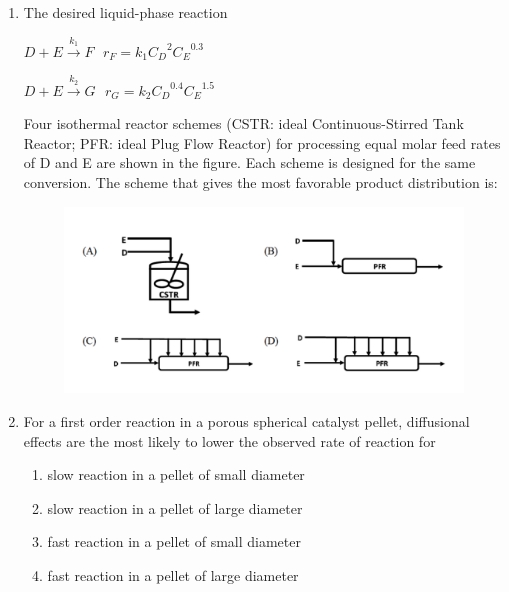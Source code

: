 \documentclass[journal,12pt,onecolumn]{IEEEtran}
\theoremstyle{remark}
\begin{document}
\begin{enumerate}
    \item  The desired liquid-phase reaction

    

     $D + E \overset{k_1}{\to} F \hspace{8pt} r_F = k_1 {C_D}^{2} {C_E}^{0.3}$ 

   
        
            $D + E \overset{k_2}{\to} G \hspace{8pt} r_G = k_2 {C_D}^{0.4} {C_E}^{1.5}$
    
        
Four isothermal reactor schemes (CSTR: ideal Continuous-Stirred Tank Reactor; PFR: ideal Plug Flow Reactor) for processing equal molar feed rates of D and E are shown in the figure. Each scheme is designed for the same conversion. The scheme that gives the most favorable product distribution is:

 \hfill{}
\begin{figure}[H]
    \centering
    \includegraphics[width=1\columnwidth]{Fig/10.png}
    \caption{}
    \label{fig:10}
\end{figure}

    \item For a first order reaction in a porous spherical catalyst pellet, diffusional effects are the most likely to lower the observed rate of reaction for
    
 \hfill{}
\begin{enumerate}
    \item slow reaction in a pellet of small diameter
    \item slow reaction in a pellet of large diameter
    \item fast reaction in a pellet of small diameter
    \item fast reaction in a pellet of large diameter
\end{enumerate}


\end{enumerate}
\end{document}
